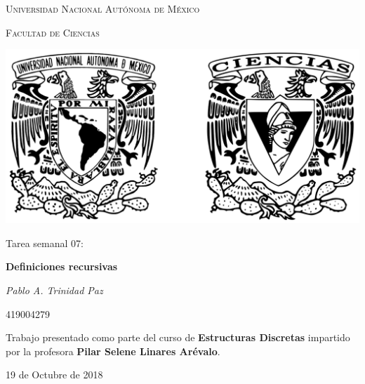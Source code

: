 \documentclass[11pt,letterpaper]{article}
\begin{document}
\begin{titlepage}
    \centering

    {\scshape\LARGE Universidad Nacional Autónoma de México \par}

    \vspace{1cm}
    {\scshape\Large Facultad de Ciencias\par}
    \vspace{1.5cm}

    \begin{center}
        \includegraphics[scale=.1]{../../assets/img/logo.png}
    \end{center}

    \vspace{.8 cm}

    {\LARGE Tarea semanal 07: \par}
    {\huge\bfseries Definiciones recursivas \par}

    \vspace{0.5cm}
    {\large\itshape Pablo A. Trinidad Paz\par}
    419004279

    \vfill

    Trabajo presentado como parte del curso de \textbf{Estructuras Discretas}
    impartido por la profesora \textbf{Pilar Selene Linares Arévalo}. \par
    \vspace{0.1cm}
    {\large 19 de Octubre de 2018\par}
\end{titlepage}
\end{document}
